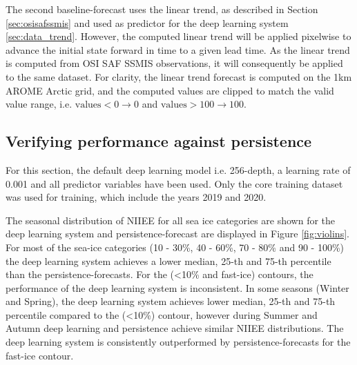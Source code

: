 \documentclass[../main/thesis.tex]{subfiles}
\begin{document}
The second baseline-forecast uses the linear trend, as described in Section \ref{sec:osisafssmis} and used as predictor for the deep learning system \ref{sec:data_trend}. However, the computed linear trend will be applied pixelwise to advance the initial state forward in time to a given lead time. As the linear trend is computed from OSI SAF SSMIS observations, it will consequently be applied to the same dataset. For clarity, the linear trend forecast is computed on the 1km AROME Arctic grid, and the computed values are clipped to match the valid value range, i.e. $\text{values} < 0 \rightarrow 0$  and $\text{values} > 100 \rightarrow 100$.

\subsection{Verifying performance against persistence}
\label{sec:performance-persistence}
For this section, the default deep learning model i.e. 256-depth, a learning rate of 0.001 and all predictor variables have been used. Only the core training dataset was used for training, which include the years 2019 and 2020.

The seasonal distribution of NIIEE for all sea ice categories are shown for the deep learning system and persistence-forecast are displayed in Figure \ref{fig:violins}. For most of the sea-ice categories (10 - 30\%, 40 - 60\%, 70 - 80\% and 90 - 100\%) the deep learning system achieves a lower median, 25-th and 75-th percentile than the persistence-forecasts. For the (<10\% and fast-ice) contours, the performance of the deep learning system is inconsistent. In some seasons (Winter and Spring), the deep learning system achieves lower median, 25-th and 75-th percentile compared to the (<10\%) contour, however during Summer and Autumn deep learning and persistence achieve similar NIIEE distributions. The deep learning system is consistently outperformed by persistence-forecasts for the fast-ice contour.
\end{document}
